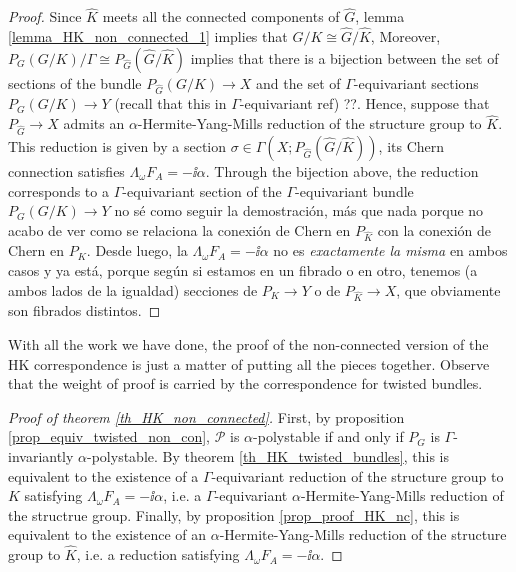 {
\begin{proof}
    Since \(\hat{K}\) meets all the connected components of \(\hat{G}\), lemma \ref{lemma_HK_non_connected_1} implies that \(G/K\cong \hat{G}/\hat{K}\), Moreover, \(P_G(G/K)/\Gamma \cong P_{\hat{G}}(\hat{G}/\hat{K})\) implies that there is a bijection between the set of sections of the bundle \(P_{\hat{G}}(G/K)\to X\) and the set of \(\Gamma\)-equivariant sections \(P_G(G/K)\to Y\) (recall that this in \(\Gamma\)-equivariant {\color{red}ref}) {\color{red}??}. Hence, suppose that \(P_{\hat{G}} \to X\) admits an \(\alpha\)-Hermite-Yang-Mills reduction of the structure group to \(\hat{K}\). This reduction is given by a section \(\sigma\in \Gamma(X; P_{\hat{G}}(\hat{G}/\hat{K}))\), its Chern connection satisfies \(\Lambda_\omega F_A=-\ii \alpha\). Through the bijection above, the reduction corresponds to a \(\Gamma\)-equivariant section of the \(\Gamma\)-equivariant bundle \(P_G(G/K)\to Y\) {\color{red} no sé como seguir la demostración, más que nada porque no acabo de ver como se relaciona la conexión de Chern en \(P_{\hat{K}}\) con la conexión de Chern en \(P_K\). Desde luego, la \(\Lambda_\omega F_A=-\ii \alpha\) no es \textit{exactamente la misma} en ambos casos y ya está, porque según si estamos en un fibrado o en otro, tenemos (a ambos lados de la igualdad) secciones de \(P_K \to Y\) o de \(P_{\hat{K}}\to X\), que obviamente son fibrados distintos.}
\end{proof}

With all the work we have done, the proof of the non-connected version of the HK correspondence is just a matter of putting all the pieces together. Observe that the weight of proof is carried by the correspondence for twisted bundles.
\begin{proof}[\textit{Proof of theorem} \ref{th_HK_non_connected}]
First, by proposition \ref{prop_equiv_twisted_non_con}, \(\mathcal{P}\) is \(\alpha\)-polystable if and only if \(P_G\) is \(\Gamma\)-invariantly \(\alpha\)-polystable. By theorem \ref{th_HK_twisted_bundles}, this is equivalent to the existence of a \(\Gamma\)-equivariant reduction of the structure group to \(K\) satisfying \(\Lambda_\omega F_A=-\ii \alpha\), i.e. a \(\Gamma\)-equivariant \(\alpha\)-Hermite-Yang-Mills reduction of the structrue group. Finally, by proposition \ref{prop_proof_HK_nc}, this is equivalent to the existence of an \(\alpha\)-Hermite-Yang-Mills reduction of the structure group to \(\hat{K}\), i.e. a reduction satisfying \(\Lambda_\omega F_A=-\ii \alpha\).
\end{proof}

}
